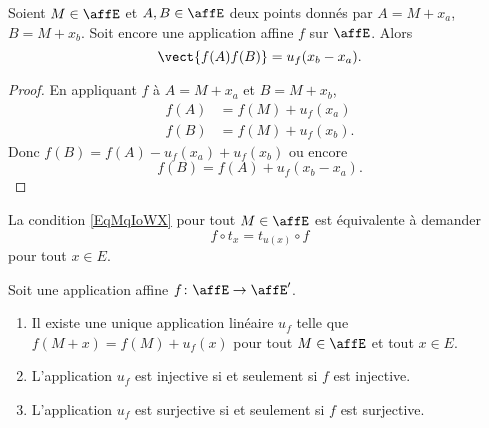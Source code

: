 \begin{lemma}       \label{LEMooXXTPooKYFGGM}
	Soient \( M\in \affE\) et \( A,B\in \affE\) deux points donnés par \( A=M+x_a\), \( B=M+x_b\). Soit encore une application affine \( f\) sur \( \affE\). Alors
	\begin{equation}
		\vect{  f(A)f(B)  } =u_f(x_b-x_a).
	\end{equation}
\end{lemma}

\begin{proof}
	En appliquant \( f\) à \( A=M+x_a\) et \( B=M+x_b\),
	\begin{subequations}
		\begin{align}
			f(A) & =f(M)+u_f(x_a)  \\
			f(B) & =f(M)+u_f(x_b).
		\end{align}
	\end{subequations}
	Donc \( f(B)=f(A)-u_f(x_a)+u_f(x_b)\) ou encore
	\begin{equation}
		f(B)=f(A)+u_f(x_b-x_a).
	\end{equation}
\end{proof}

\begin{remark}
	La condition \eqref{EqMqIoWX} pour tout \( M\in\affE\) est équivalente à demander
	\begin{equation}
		f\circ t_x=t_{u(x)}\circ f
	\end{equation}
	pour tout \( x\in E\).
\end{remark}

\begin{proposition}     \label{PROPooALXYooHoMdqQ}
	Soit une application affine \( f\colon \affE\to \affE'\).
	\begin{enumerate}
		\item       \label{ITEMooSKCYooHyRZYN}
		      Il existe une unique application linéaire \( u_f\) telle que \( f(M+x)=f(M)+u_f(x)\) pour tout \( M\in \affE\) et tout \( x\in E\).
		\item
		      L'application \( u_f\) est injective si et seulement si \( f\) est injective.
		\item
		      L'application \( u_f\) est surjective si et seulement si \( f\) est surjective.
	\end{enumerate}
\end{proposition}

